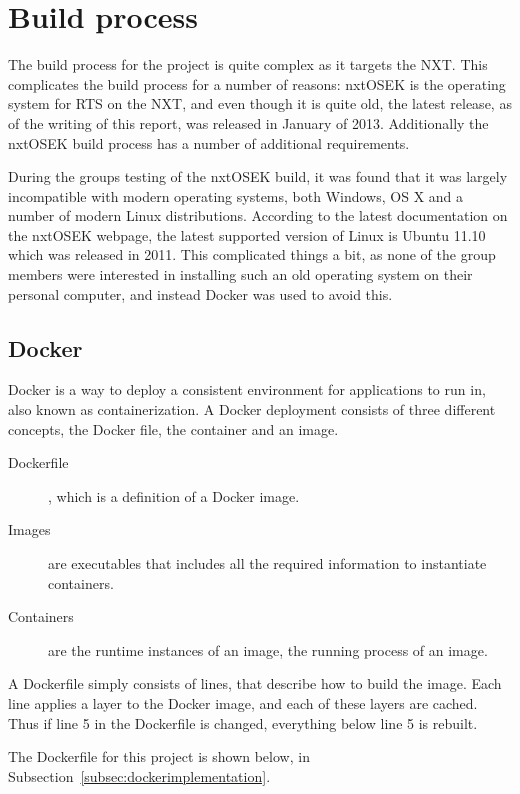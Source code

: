 \section{Build process}\label{sec:buildprocess}
The build process for the project is quite complex as it targets the NXT.
This complicates the build process for a number of reasons:
nxtOSEK is the operating system for RTS on the NXT, and even though it is quite old, the latest release, as of the writing of this report, was released in January of 2013\cite{osekrelease}.
Additionally the nxtOSEK build process has a number of additional requirements.

During the groups testing of the nxtOSEK build, it was found that it was largely incompatible with modern operating systems, both Windows, OS X and a number of modern Linux distributions.
According to the latest documentation on the nxtOSEK webpage, the latest supported version of Linux is Ubuntu 11.10 which was released in 2011.
This complicated things a bit, as none of the group members were interested in installing such an old operating system on their personal computer, and instead Docker was used to avoid this.

\subsection{Docker}\label{subsec:docker}
Docker is a way to deploy a consistent environment for applications to run in, also known as containerization\cite{dockerdocstart}.
A Docker deployment consists of three different concepts, the Docker file, the container and an image.
\begin{description}
    \item [Dockerfile], which is a definition of a Docker image.
    \item [Images] are executables that includes all the required information to instantiate containers.
    \item[Containers] are the runtime instances of an image, the running process of an image.
\end{description}

A Dockerfile simply consists of lines, that describe how to build the image.
Each line applies a layer to the Docker image, and each of these layers are cached.
Thus if line 5 in the Dockerfile is changed, everything below line 5 is rebuilt.

The Dockerfile for this project is shown below, in Subsection~\ref{subsec:dockerimplementation}.

